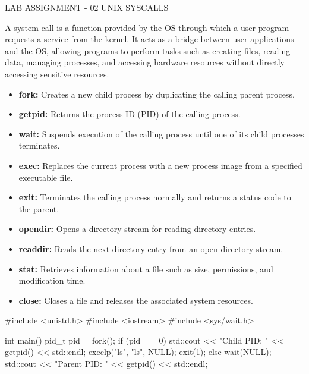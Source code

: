 
\assignmenttitle
    {LAB ASSIGNMENT - 02}
    {UNIX SYSCALLS}


A system call is a function provided by the OS through which a user program requests a service from the kernel. It acts as a bridge between user applications and the OS, allowing programs to perform tasks such as creating files, reading data, managing processes, and accessing hardware resources without directly accessing sensitive resources.

\begin{itemize}
\item \textbf{fork:} Creates a new child process by duplicating the calling parent process.
\item \textbf{getpid:} Returns the process ID (PID) of the calling process.
\item \textbf{wait:} Suspends execution of the calling process until one of its child processes terminates.
\item \textbf{exec:} Replaces the current process with a new process image from a specified executable file.
\item \textbf{exit:} Terminates the calling process normally and returns a status code to the parent.
\end{itemize}

\begin{itemize}
\item \textbf{opendir:} Opens a directory stream for reading directory entries.
\item \textbf{readdir:} Reads the next directory entry from an open directory stream.
\item \textbf{stat:} Retrieves information about a file such as size, permissions, and modification time.
\item \textbf{close:} Closes a file and releases the associated system resources.
\end{itemize}

\programs


\codelabel

\begin{code}
#include <unistd.h>
#include <iostream>
#include <sys/wait.h>

int main() {
    pid_t pid = fork();
    if (pid == 0) {
        std::cout << "Child PID: " << getpid() << std::endl;
        execlp("ls", "ls", NULL);
        exit(1);
    } else {
        wait(NULL);
        std::cout << "Parent PID: " << getpid() << std::endl;
    }
}
\end{code}

